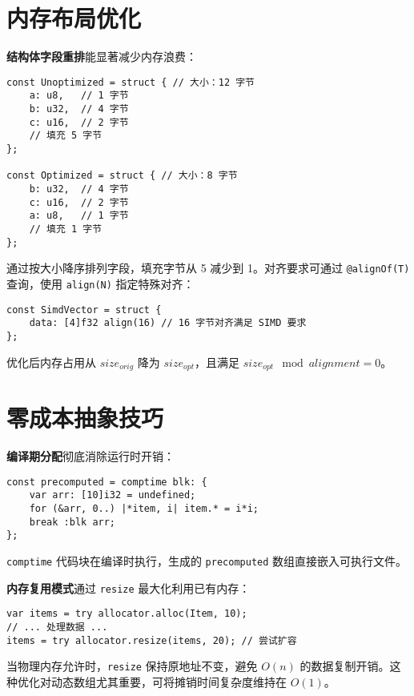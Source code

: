 \section{内存布局优化}
\textbf{结构体字段重排}能显著减少内存浪费：\par
\begin{lstlisting}[language=zig]
const Unoptimized = struct { // 大小：12 字节
    a: u8,   // 1 字节
    b: u32,  // 4 字节
    c: u16,  // 2 字节
    // 填充 5 字节
};

const Optimized = struct { // 大小：8 字节
    b: u32,  // 4 字节
    c: u16,  // 2 字节
    a: u8,   // 1 字节
    // 填充 1 字节
};
\end{lstlisting}
通过按大小降序排列字段，填充字节从 5 减少到 1。对齐要求可通过 \texttt{@alignOf(T)} 查询，使用 \texttt{align(N)} 指定特殊对齐：\par
\begin{lstlisting}[language=zig]
const SimdVector = struct {
    data: [4]f32 align(16) // 16 字节对齐满足 SIMD 要求
};
\end{lstlisting}
优化后内存占用从 $size_{orig}$ 降为 $size_{opt}$，且满足 $size_{opt} \mod alignment = 0$。\par
\section{零成本抽象技巧}
\textbf{编译期分配}彻底消除运行时开销：\par
\begin{lstlisting}[language=zig]
const precomputed = comptime blk: {
    var arr: [10]i32 = undefined;
    for (&arr, 0..) |*item, i| item.* = i*i;
    break :blk arr;
};
\end{lstlisting}
\texttt{comptime} 代码块在编译时执行，生成的 \texttt{precomputed} 数组直接嵌入可执行文件。\par
\textbf{内存复用模式}通过 \texttt{resize} 最大化利用已有内存：\par
\begin{lstlisting}[language=zig]
var items = try allocator.alloc(Item, 10);
// ... 处理数据 ...
items = try allocator.resize(items, 20); // 尝试扩容
\end{lstlisting}
当物理内存允许时，\texttt{resize} 保持原地址不变，避免 $O(n)$ 的数据复制开销。这种优化对动态数组尤其重要，可将摊销时间复杂度维持在 $O(1)$。\par
